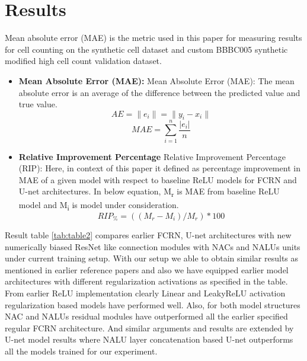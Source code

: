 \documentclass[conference]{IEEEtran}
\begin{document}
\section{Results}

Mean absolute error (MAE) is the metric used in this paper for measuring results for cell counting on the synthetic cell dataset \cite{b28} and custom BBBC005 synthetic modified high cell count validation dataset.

\begin{itemize}
\item \textbf{Mean Absolute Error (MAE):}
Mean Absolute Error (MAE): The mean absolute error is an average of the difference between the predicted value and true value.
\begin{equation}
AE = \|e_i\| = \|y_i - x_i\|
\end{equation}
\begin{equation}
MAE = \sum_{i=1}^{n} \frac{|e_i|}{n}
\end{equation}
\end{itemize}

\begin{itemize}
\item \textbf{Relative Improvement  Percentage}
Relative Improvement  Percentage (RIP): Here, in context of this paper it defined as percentage improvement in MAE of a given model with respect to baseline ReLU models for FCRN and U-net architectures. In below equation, M\textsubscript{r} is MAE from baseline ReLU model and M\textsubscript{i} is model under consideration.
\begin{equation}
 RIP_\% = ((M_r - M_i) / M_r) * 100
\end{equation}

\end{itemize}




Result table \ref{tab:table2} compares earlier FCRN, U-net architectures with new numerically biased ResNet like  connection modules with NACs and NALUs units under current training setup. With our setup we able to obtain similar results as mentioned in earlier reference papers and also we have equipped earlier model architectures with different regularization activations as specified in the table. From earlier ReLU implementation clearly Linear and LeakyReLU activation regularization based models have performed well. Also, for both model structures NAC and NALUs residual modules have outperformed all the earlier specified regular FCRN architecture. And similar arguments and results are extended by U-net model results where NALU layer concatenation based U-net outperforms all the models trained for our experiment.
\end{document}
